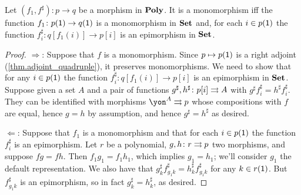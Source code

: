 \documentclass[DynamicalBook]{subfiles}
\begin{document}
\begin{proposition}
Let $(f_1,f^\sharp)\colon p\to q$ be a morphism in $\textbf{Poly}$. It is a monomorphism iff the function $f_1\colon p(\textsf{1})\to q(\textsf{1})$ is a monomorphism in $\textbf{Set}$ and, for each $i\in p(\textsf{1})$ the function $f_i^\sharp\colon q[f_1(i)]\to p[i]$ is an epimorphism in $\textbf{Set}$.
\end{proposition}
\begin{proof}
\noindent$\Rightarrow$: Suppose that $f$ is a monomorphism. Since $p\mapsto p(\textsf{1})$ is a right adjoint (\cref{thm.adjoint_quadruple}), it preserves monomorphisms. We need to show that for any $i\in p(\textsf{1})$ the function $f_i^\sharp\colon q[f_1(i)]\to p[i]$ is an epimorphism in $\textbf{Set}$. Suppose given a set $A$ and a pair of functions $g^\sharp,h^\sharp\colon p[i]\rightrightarrows A$ with $g^\sharp f_i^\sharp=h^\sharp f_i^\sharp$. They can be identified with morphisms $\yon^A\tto p$ whose compositions with $f$ are equal, hence $g=h$ by assumption, and hence $g^\sharp=h^\sharp$ as desired.

\noindent$\Leftarrow$: Suppose that $f_1$ is a monomorphism and that for each $i\in p(\textsf{1})$ the function $f_i^\sharp$ is an epimorphism. Let $r$ be a polynomial, $g,h\colon r\rightrightarrows p$ two morphisms, and suppose $fg=fh$. Then $f_1g_1=f_1h_1$, which implies $g_1=h_1$; we'll consider $g_1$ the default representation. We also have that $g^\sharp_kf^\sharp_{g_1k}=h^\sharp_kf^\sharp_{g_1k}$ for any $k\in r(\textsf{1})$. But $f^\sharp_{g_1k}$ is an epimorphism, so in fact $g^\sharp_k=h^\sharp_k$, as desired.
\end{proof}
\end{document}
